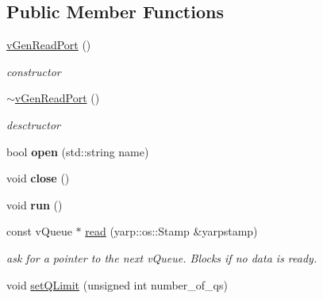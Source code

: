 \subsection*{Public Member Functions}
\begin{DoxyCompactItemize}
\item 
\hyperlink{classev_1_1vGenReadPort_a9391662e85003d3e45c75c13ebbda579}{v\+Gen\+Read\+Port} ()\hypertarget{classev_1_1vGenReadPort_a9391662e85003d3e45c75c13ebbda579}{}\label{classev_1_1vGenReadPort_a9391662e85003d3e45c75c13ebbda579}

\begin{DoxyCompactList}\small\item\em constructor \end{DoxyCompactList}\item 
\hyperlink{classev_1_1vGenReadPort_a2c1538e9e2548b7d4620578771868e67}{$\sim$v\+Gen\+Read\+Port} ()\hypertarget{classev_1_1vGenReadPort_a2c1538e9e2548b7d4620578771868e67}{}\label{classev_1_1vGenReadPort_a2c1538e9e2548b7d4620578771868e67}

\begin{DoxyCompactList}\small\item\em desctructor \end{DoxyCompactList}\item 
bool {\bfseries open} (std\+::string name)\hypertarget{classev_1_1vGenReadPort_a27800667234bf30d87c9abd85b6bd913}{}\label{classev_1_1vGenReadPort_a27800667234bf30d87c9abd85b6bd913}

\item 
void {\bfseries close} ()\hypertarget{classev_1_1vGenReadPort_a12681e054a8d8381695fed07f8bea926}{}\label{classev_1_1vGenReadPort_a12681e054a8d8381695fed07f8bea926}

\item 
void {\bfseries run} ()\hypertarget{classev_1_1vGenReadPort_af6ba25ad4d6a451f7dde5c29ab2b0cbd}{}\label{classev_1_1vGenReadPort_af6ba25ad4d6a451f7dde5c29ab2b0cbd}

\item 
const v\+Queue $\ast$ \hyperlink{classev_1_1vGenReadPort_a08b2c45a6af86e96dd7a0a5e92265250}{read} (yarp\+::os\+::\+Stamp \&yarpstamp)\hypertarget{classev_1_1vGenReadPort_a08b2c45a6af86e96dd7a0a5e92265250}{}\label{classev_1_1vGenReadPort_a08b2c45a6af86e96dd7a0a5e92265250}

\begin{DoxyCompactList}\small\item\em ask for a pointer to the next v\+Queue. Blocks if no data is ready. \end{DoxyCompactList}\item 
void \hyperlink{classev_1_1vGenReadPort_a4743880e4056af9984dbe4d29b4c9b32}{set\+Q\+Limit} (unsigned int number\+\_\+of\+\_\+qs)\hypertarget{classev_1_1vGenReadPort_a4743880e4056af9984dbe4d29b4c9b32}{}\label{classev_1_1vGenReadPort_a4743880e4056af9984dbe4d29b4c9b32}


\end{DoxyCompactItemize}
